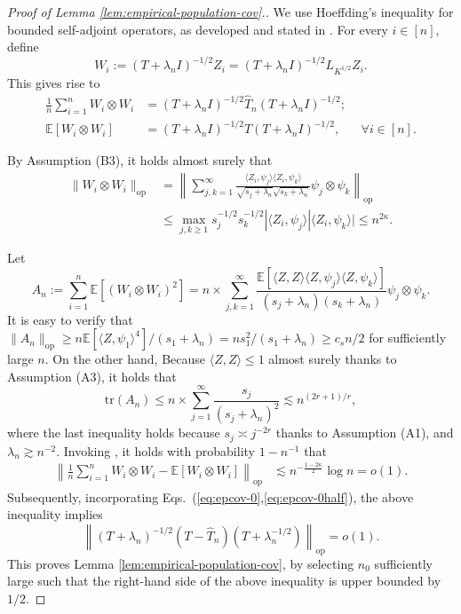 \documentclass[11pt,a4paper]{article}
\renewcommand{\hat}{\widehat}
\newcommand{\tr}{\mathrm{tr}}
\theoremstyle{definition}
\theoremstyle{plain}
\theoremstyle{remark}
\newcommand{\op}{\mathrm{op}}
\begin{document}
\begin{proof}[Proof of Lemma \ref{lem:empirical-population-cov}.]
We use Hoeffding's inequality for bounded self-adjoint operators, as developed and stated in \citep{minsker2017some}.
For every $i\in[n]$, define
$$
W_i := (T+\lambda_n I)^{-1/2}Z_i = (T+\lambda_n I)^{-1/2}L_{K^{1/2}}Z_i.
$$
This gives rise to
\begin{align}
\frac{1}{n}\sum_{i=1}^n W_i\otimes W_i &= (T+\lambda_n I)^{-1/2}\hat T_n (T+\lambda_n I)^{-1/2};\label{eq:epcov-0}\\
\mathbb E[W_i\otimes W_i] &= (T+\lambda_n I)^{-1/2} T (T+\lambda_n I)^{-1/2}, \;\;\;\;\;\;\forall i\in[n]\label{eq:epcov-0half}.
\end{align}

By Assumption (B3), it holds almost surely that 
\begin{align}
\|W_i\otimes W_i\|_\op&=\left\|\sum_{j,k=1}^{\infty}\frac{\langle Z_i,\psi_j\rangle\langle Z_i,\psi_k\rangle}{\sqrt{s_j+\lambda_n}\sqrt{s_k+\lambda_n}}\psi_j\otimes\psi_k\right\|_\op\nonumber\\
&\leq \max_{j,k\geq 1}s_j^{-1/2}s_k^{-1/2}|\langle Z_i,\psi_j\rangle|\langle Z_i,\psi_k\rangle|\leq n^{2\kappa}.
\label{eq:proof-epcov-1}
\end{align}

Let 
$$
A_n := \sum_{i=1}^n\mathbb E[(W_i\otimes W_i)^2] =n\times\sum_{j,k=1}^{\infty}\frac{\mathbb E[\langle Z,Z\rangle\langle Z,\psi_j\rangle\langle Z,\psi_k\rangle]}{(s_j+\lambda_n)(s_k+\lambda_n)}\psi_j\otimes \psi_k.
$$
It is easy to verify that $\|A_n\|_\op \geq n\mathbb E[\langle Z,\psi_1\rangle^4]/(s_1+\lambda_n)=ns_1^2/(s_1+\lambda_n)\geq c_sn/2$ for sufficiently large $n$. 
On the other hand, Because $\langle Z,Z\rangle\leq 1$ almost surely thanks to Assumption (A3), it holds that
\begin{equation}
\tr(A_n) \leq n\times \sum_{j=1}^{\infty} \frac{s_j}{(s_j+\lambda_n)^2} \lesssim n^{(2r+1)/r},
\label{eq:proof-epcov-2}
\end{equation}
where the last inequality holds because $s_j\asymp j^{-2r}$ thanks to Assumption (A1), and $\lambda_n\gtrsim n^{-2}$.
Invoking \citep[Theorem 3.1]{minsker2017some}, it holds with probability $1-n^{-1}$ that
\begin{align*}
\left\|\frac{1}{n}\sum_{i=1}^n W_i\otimes W_i-\mathbb E[W_i\otimes W_i]\right\|_\op &\lesssim n^{-\frac{1-2\kappa}{2}}\log n = o(1). 
\end{align*}
Subsequently, incorporating Eqs.~(\ref{eq:epcov-0},\ref{eq:epcov-0half}), the above inequality implies
$$
\left\|(T+\lambda_n)^{-1/2}(T-\hat T_n)(T+\lambda_n^{-1/2})\right\|_\op = o(1).
$$
This proves Lemma \ref{lem:empirical-population-cov}, by selecting $n_0$ sufficiently large such that the right-hand side of the above inequality is upper bounded by $1/2$.
\end{proof}
\end{document}
